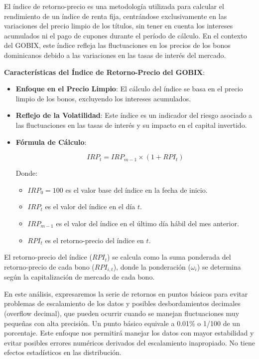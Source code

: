 \documentclass[
  number,
  preprint,
  3p,
  onecolumn]{elsarticle}
\providecommand{\tightlist}{%
  \setlength{\itemsep}{0pt}\setlength{\parskip}{0pt}}\usepackage{longtable,booktabs,array}
\begin{document}
El índice de retorno-precio es una metodología utilizada para calcular
el rendimiento de un índice de renta fija, centrándose exclusivamente en
las variaciones del precio limpio de los títulos, sin tener en cuenta
los intereses acumulados ni el pago de cupones durante el período de
cálculo. En el contexto del GOBIX, este índice refleja las fluctuaciones
en los precios de los bonos dominicanos debido a las variaciones en las
tasas de interés del mercado.

\textbf{Características del Índice de Retorno-Precio del GOBIX}:

\begin{itemize}
\item
  \textbf{Enfoque en el Precio Limpio}: El cálculo del índice se basa en
  el precio limpio de los bonos, excluyendo los intereses acumulados.
\item
  \textbf{Reflejo de la Volatilidad}: Este índice es un indicador del
  riesgo asociado a las fluctuaciones en las tasas de interés y su
  impacto en el capital invertido.
\item
  \textbf{Fórmula de Cálculo}:

  \[
  IRP_t = IRP_{m-1} \times (1 + RPI_t)
  \]

  Donde:

  \begin{itemize}
  \tightlist
  \item
    \(IRP_0 = 100\) es el valor base del índice en la fecha de inicio.
  \item
    \(IRP_t\) es el valor del índice en el día \(t\).
  \item
    \(IRP_{m-1}\) es el valor del índice en el último día hábil del mes
    anterior.
  \item
    \(RPI_t\) es el retorno-precio del índice en \(t\).
  \end{itemize}
\end{itemize}

El retorno-precio del índice (\(RPI_t\)) se calcula como la suma
ponderada del retorno-precio de cada bono (\(RPI_{i,t}\)), donde la
ponderación (\(\omega_i\)) se determina según la capitalización de
mercado de cada bono.

En este análisis, expresaremos la serie de retornos en puntos básicos
para evitar problemas de escalamiento de los datos y posibles
desbordamientos decimales (overflow decimal), que pueden ocurrir cuando
se manejan fluctuaciones muy pequeñas con alta precisión. Un punto
básico equivale a 0.01\% o 1/100 de un porcentaje. Este enfoque nos
permitirá manejar los datos con mayor estabilidad y evitar posibles
errores numéricos derivados del escalamiento inapropiado. No tiene
efectos estadísticos en las distribución.
\end{document}
